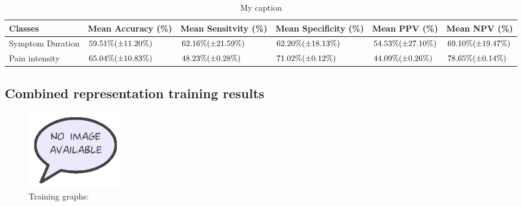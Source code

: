 \documentclass[12pt,a4paper]{article}
\begin{document}
\begin{table}[H]
\centering
\begin{tabular}{|p{2cm}|p{2.2cm}|p{2.2cm}|p{2.2cm}|p{2cm}|p{2cm}|}
\hline
Classes          & Mean Accuracy (\%) & Mean Sensitvity (\%) & Mean Specificity (\%) & Mean PPV (\%) & Mean NPV (\%) \\ \hline
Symptom Duration & $59.51\%\newline(\pm11.20\%)$ & $62.16\%\newline(\pm21.59\%)$ & $62.20\%\newline(\pm18.13\%)$ & $54.53\%\newline(\pm27.10\%)$ & $69.10\%\newline(\pm19.47\%)$ \\ \hline
Pain intensity   & $65.04\%\newline(\pm10.83\%)$ & $48.23\%\newline(\pm0.28\%)$ & $71.02\%\newline(\pm0.12\%)$ & $44.09\%\newline(\pm0.26\%)$ & $78.65\%\newline(\pm0.14\%)$ \\ \hline
\end{tabular}
\label{my-label}
\caption{My caption}
\end{table}

\subsection{Combined representation training results}
\begin{figure} [H]
\centering
\includegraphics[width=0.2\textwidth]{figures/missimage}
\caption{Training graphs:}
\label{fig:combinedGraph}  
\end{figure}
\end{document}
